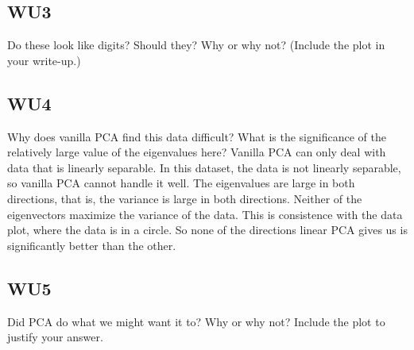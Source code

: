\documentclass[a4paper,11pt]{article}
\begin{document}
\subsection{WU3}
\textsf{Do these look like digits? Should they? Why or why not?
(Include the plot in your write-up.)}\vspace{0.1in}


\subsection{WU4}
\textsf{Why does vanilla PCA find this data difficult? What is the
significance of the relatively large value of the eigenvalues
here?}\vspace{0.1in}
Vanilla PCA can only deal with data that is linearly separable. In this dataset, the data is not linearly separable, so vanilla PCA cannot handle it well. 
The eigenvalues are large in both directions, that is, the variance is large in both directions. Neither of the eigenvectors maximize the variance of the data. This is consistence with the data plot, where the data is in a circle. So none of the directions linear PCA gives us is significantly better than the other.  



\subsection{WU5}
\textsf{Did PCA do what we might want it to? Why or why not? Include
the plot to justify your answer.}\vspace{0.1in}

\end{document}
